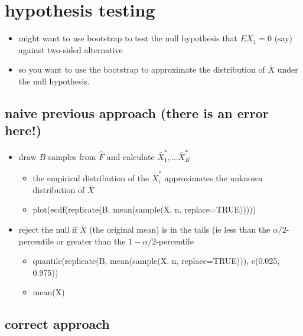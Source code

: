 \section{hypothesis testing}

\begin{itemize}
\item might want to use bootstrap to test the null hypothesis that 
      $E X_1 = 0$ (say) against two-sided alternative
\item so you want to use the bootstrap to approximate the distribution
      of $\bar X$ under the null hypothesis.
\end{itemize}

\subsection{naive previous approach (there is an error here!)}

\begin{itemize}
\item draw $B$ samples from $\hat F$ and calculate $\bar X_1^*,\dots
       \bar X_B^*$
\begin{itemize}
\item the empirical distribution of the $\bar X_i^*$ approximates
         the unknown distribution of $\bar X$
\item plot(ecdf(replicate(B, mean(sample(X, n, replace=TRUE)))))
\end{itemize}
\item reject the null if $\bar X$ (the original mean) is in the tails
       (ie less than the $\alpha/2$-percentile or greater than the
       $1-\alpha/2$-percentile
\begin{itemize}
\item quantile(replicate(B, mean(sample(X, n, replace=TRUE))), 
         c(0.025, 0.975))
\item mean(X)
\end{itemize}
\end{itemize}

\subsection{correct approach}

